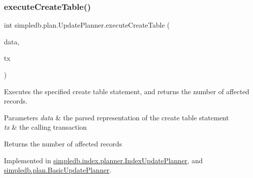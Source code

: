 \mbox{\label{interfacesimpledb_1_1plan_1_1UpdatePlanner_a44085c8b895a3da12486d3f59fde4a3a}} 
\subsubsection{\texorpdfstring{execute\+Create\+Table()}{executeCreateTable()}}
{\footnotesize\ttfamily int simpledb.\+plan.\+Update\+Planner.\+execute\+Create\+Table (\begin{DoxyParamCaption}\item[{\hyperlink{classsimpledb_1_1parse_1_1CreateTableData}{Create\+Table\+Data}}]{data,  }\item[{\hyperlink{classsimpledb_1_1tx_1_1Transaction}{Transaction}}]{tx }\end{DoxyParamCaption})}

Executes the specified create table statement, and returns the number of affected records. 
\begin{DoxyParams}{Parameters}
{\em data} & the parsed representation of the create table statement \\
\hline
{\em tx} & the calling transaction \\
\hline
\end{DoxyParams}
\begin{DoxyReturn}{Returns}
the number of affected records 
\end{DoxyReturn}


Implemented in \hyperlink{classsimpledb_1_1index_1_1planner_1_1IndexUpdatePlanner_a530ca9f0043be30f228ccaf7d99ce0bb}{simpledb.\+index.\+planner.\+Index\+Update\+Planner}, and \hyperlink{classsimpledb_1_1plan_1_1BasicUpdatePlanner_ad29eefdb27d7f1c40de1af9031abc5b8}{simpledb.\+plan.\+Basic\+Update\+Planner}.

\mbox{\label{interfacesimpledb_1_1plan_1_1UpdatePlanner_a3f1e2a94b4ca0c9c4090989670fd111a}} 
